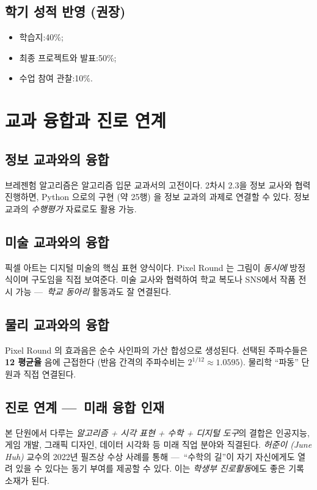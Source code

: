 \documentclass[12pt,a4paper]{scrartcl}
\newcommand{\acc}[1]{\textcolor{accent}{\textbf{#1}}}
\begin{document}
\subsection{학기 성적 반영 (권장)}
\begin{itemize}[leftmargin=1.3em,itemsep=0.1em,topsep=0.2em,nosep]
  \item 학습지:40\%;
  \item 최종 프로젝트와 발표:50\%;
  \item 수업 참여 관찰:10\%.
\end{itemize}

\section{교과 융합과 진로 연계}

\subsection{정보 교과와의 융합}
브레젠험 알고리즘은 알고리즘 입문 교과서의 고전이다. 2차시 2.3을 정보 교사와 협력 진행하면, Python 으로의 구현 (약 25행) 을 정보 교과의 과제로 연결할 수 있다. 정보 교과의 \emph{수행평가} 자료로도 활용 가능.

\subsection{미술 교과와의 융합}
픽셀 아트는 디지털 미술의 핵심 표현 양식이다. Pixel Round 는 그림이 \emph{동시에} 방정식이며 구도임을 직접 보여준다. 미술 교사와 협력하여 학교 복도나 SNS에서 작품 전시 가능 ---\, \emph{학교 동아리} 활동과도 잘 연결된다.

\subsection{물리 교과와의 융합}
Pixel Round 의 효과음은 순수 사인파의 가산 합성으로 생성된다. 선택된 주파수들은 \acc{12 평균율} 음에 근접한다 (반음 간격의 주파수비는 $2^{1/12} \approx 1.0595$). 물리학 ``파동'' 단원과 직접 연결된다.

\subsection{진로 연계 ---\, 미래 융합 인재}
본 단원에서 다루는 \emph{알고리즘 + 시각 표현 + 수학 + 디지털 도구}의 결합은 인공지능, 게임 개발, 그래픽 디자인, 데이터 시각화 등 미래 직업 분야와 직결된다. \emph{허준이 (June Huh)} 교수의 2022년 필즈상 수상 사례를 통해 ---\, ``수학의 길''이 자기 자신에게도 열려 있을 수 있다는 동기 부여를 제공할 수 있다. 이는 \emph{학생부 진로활동}에도 좋은 기록 소재가 된다.
\end{document}
